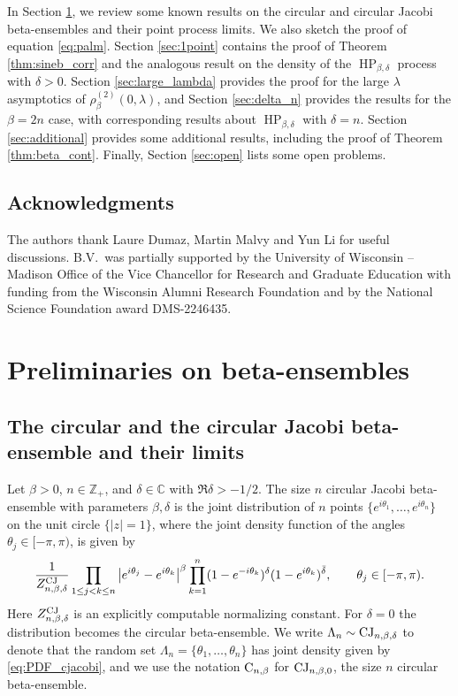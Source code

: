 \documentclass[12pt]{article}
\theoremstyle{definition} %
\newcommand{\Z}{{\mathbb Z}}
\newcommand{\CC}{{\mathbb C}}
\theoremstyle{remark} %
\newcommand{\HPb}{\operatorname{HP}_{\beta, \delta}}
\begin{document}
In Section \ref{sec:background}, we review some known results on the circular and circular Jacobi beta-ensembles and their point process limits. We also sketch the proof of equation \eqref{eq:palm}. Section \ref{sec:1point} contains the proof of Theorem \ref{thm:sineb_corr} and the analogous result on the density of the $\HPb$ process with $\delta>0$.  Section \ref{sec:large_lambda} provides the proof for the large $\lambda$ asymptotics of $\rho_{\beta}^{(2)}(0,\lambda)$, and Section  \ref{sec:delta_n} provides the results for the $\beta=2n$ case, with corresponding results about $\HPb$ with $\delta=n$. 
Section \ref{sec:additional} provides some additional results, including the proof of Theorem \ref{thm:beta_cont}. 
Finally, Section \ref{sec:open} lists some open problems. 









\subsection*{Acknowledgments} 

The authors  thank Laure Dumaz, Martin Malvy and Yun Li for useful discussions. 
B.V.~was partially supported by  the University of Wisconsin – Madison Office of the Vice Chancellor for Research and Graduate Education with funding from the Wisconsin Alumni Research Foundation and by the National Science Foundation award DMS-2246435. 


\section{Preliminaries on beta-ensembles}\label{sec:background}


\subsection{The circular and the circular Jacobi beta-ensemble and their limits}



Let $\beta>0$, $n\in \Z_+$, and $\delta\in \CC$ with $\Re \delta>-1/2$. The size $n$ circular Jacobi beta-ensemble with parameters $\beta, \delta$ is the joint distribution  of 
$n$  points $\{e^{i \theta_1}, \dots, e^{i \theta_n}\}$ on the unit circle $\{|z|=1\}$, where the joint density function of the angles $\theta_j\in [-\pi,\pi)$, is given by
\begin{align}
 \frac{1}{Z_{n,\beta,\delta}^{\textup{CJ}}} \prod_{1\le j<k\le n} \left|e^{i \theta_j}-e^{i \theta_k}\right|^\beta  \prod_{k=1}^n (1-e^{- i \theta_k})^{ \delta}(1-e^{ i \theta_k})^{ \bar\delta} \label{eq:PDF_cjacobi}, \qquad \theta_j\in [-\pi,\pi).
\end{align}
Here  $Z_{n,\beta,\delta}^{\textup{CJ}}$ is an explicitly computable normalizing constant. For $\delta=0$ the distribution becomes the circular beta-ensemble. We  write $\Lambda_n\sim \textup{CJ}_{n,\beta,\delta}$ to denote that the random set $\Lambda_n=\{\theta_1, \dots, \theta_n\}$ has  joint density given by \eqref{eq:PDF_cjacobi}, and we use the notation $\textup{C}_{n,\beta}$ for $\textup{CJ}_{n,\beta,0}$, the size $n$ circular beta-ensemble.
\end{document}
